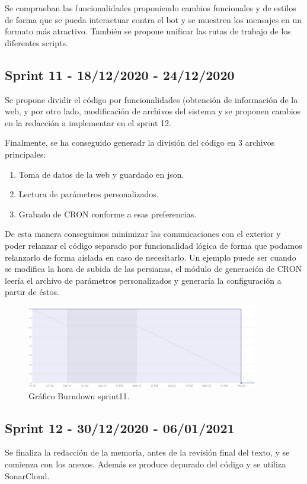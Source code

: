 Se comprueban las funcionalidades proponiendo cambios funcionales y de estilos de forma que se pueda interactuar contra el bot y se muestren los mensajes en un formato más atractivo. También se propone unificar las rutas de trabajo de los diferentes scripts.


\subsection{Sprint 11 - 18/12/2020 - 24/12/2020}
Se propone dividir el código por funcionalidades (obtención de información de la web, y por otro lado, modificación de archivos del sistema y se proponen cambios en la redacción a implementar en el sprint 12.

Finalmente, se ha conseguido generadr la división del código en 3 archivos principales:
\begin{enumerate}
    \item Toma de datos de la web y guardado en json.
    \item Lectura de parámetros personalizados.
    \item Grabado de CRON conforme a esas preferencias.
\end{enumerate}

De esta manera conseguimos minimizar las comunicaciones con el exterior y poder relanzar el código separado por funcionalidad lógica de forma que podamos relanzarlo de forma aislada en caso de necesitarlo. Un ejemplo puede ser cuando se modifica la hora de subida de las persianas, el módulo de generación de CRON leería el archivo de parámetros personalizados y generaría la configuración a partir de éstos.

\begin{figure}
    \centering
    \includegraphics[width=0.9\textwidth]{img/BurnDown/11.PNG}
    \caption{Gráfico Burndown sprint11. } \label{BD11}
\end{figure}

\subsection{Sprint 12 - 30/12/2020 - 06/01/2021}
Se finaliza la redacción de la memoria, antes de la revisión final del texto, y se comienza con los anexos. Además se produce depurado del código y se utiliza SonarCloud.

